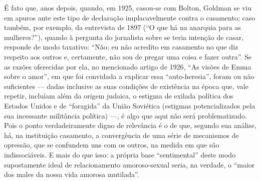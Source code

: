 É fato que, anos depois, quando, em 1925, casou-se com Bolton, Goldman
se viu em apuros ante este tipo de declaração implacavelmente contra o
casamento; caso também, por exemplo, da entrevista de 1897 (``O que há
na anarquia para as mulheres?''), quando à pergunta do jornalista sobre
se teria intenção de casar, responde de modo taxativo: ``Não; eu não
acredito em casamento no que diz respeito aos outros e, certamente, não
sou de pregar uma coisa e fazer outra''. Se as razões oferecidas por
ela, no mencionado artigo de 1926, ``As visões de Emma sobre o amor'',
em que foi convidada a explicar essa ``auto-heresia'', foram ou não
suficientes --- dadas inclusive as suas condições de existência na época
que, vale repetir, incluíam além da origem judaica, o estigma de exilada
política dos Estados Unidos e de ``foragida'' da União Soviética
(estigmas potencializados pela sua incessante militância política) ---, é
algo que aqui não será problematizado. Pois o ponto verdadeiramente
digno de relevância é o de que, segundo sua análise, há, na instituição
casamento, a convergência de uma série de mecanismos de opressão, que se
confundem uns com os outros, na medida em que são indissociáveis. E mais
do que isso: a própria base ``sentimental'' deste modo supostamente
ideal de relacionamento amoroso-sexual seria, na verdade, o ``maior dos
males da nossa vida amorosa mutilada''.

